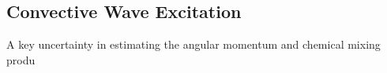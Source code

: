 {\color{purple}
\subsection{Convective Wave Excitation}
}

A key uncertainty in estimating the angular momentum and chemical mixing produ
